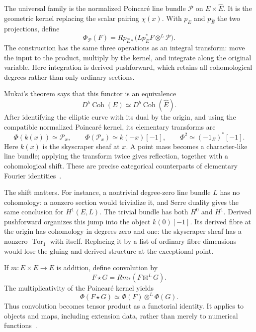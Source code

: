 \documentclass[11pt]{article}
\theoremstyle{remark}
\begin{document}
The universal family is the normalized Poincar\'e line bundle \(\mathcal P\) on \(E\times\widehat E\). It is the geometric kernel replacing the scalar pairing \(\chi(x)\). With \(p_E\) and \(p_{\widehat E}\) the two projections, define
\begin{equation}
\Phi_{\mathcal P}(F)
=Rp_{\widehat E*}
\bigl(Lp_E^*F\otimes^{L}\mathcal P\bigr).
\label{categorical:fm}
\end{equation}
The construction has the same three operations as an integral transform: move the input to the product, multiply by the kernel, and integrate along the original variable. Here integration is derived pushforward, which retains all cohomological degrees rather than only ordinary sections.

Mukai's theorem says that this functor is an equivalence
\[
D^b\operatorname{Coh}(E)
\simeq D^b\operatorname{Coh}(\widehat E).
\]
After identifying the elliptic curve with its dual by the origin, and using the compatible normalized Poincar\'e kernel, its elementary transforms are
\begin{equation}
\Phi(k(x))\simeq\mathcal P_x,
\qquad
\Phi(\mathcal P_x)\simeq k(-x)[-1],
\qquad
\Phi^2\simeq(-1_E)^*[-1].
\label{categorical:inversion}
\end{equation}
Here \(k(x)\) is the skyscraper sheaf at \(x\). A point mass becomes a character-like line bundle; applying the transform twice gives reflection, together with a cohomological shift. These are precise categorical counterparts of elementary Fourier identities~\cite{chen}.

The shift matters. For instance, a nontrivial degree-zero line bundle \(L\) has no cohomology: a nonzero section would trivialize it, and Serre duality gives the same conclusion for \(H^1(E,L)\). The trivial bundle has both \(H^0\) and \(H^1\). Derived pushforward organizes this jump into the object \(k(0)[-1]\). Its derived fibre at the origin has cohomology in degrees zero and one: the skyscraper sheaf has a nonzero \(\operatorname{Tor}_1\) with itself. Replacing it by a list of ordinary fibre dimensions would lose the gluing and derived structure at the exceptional point.

If \(m:E\times E\to E\) is addition, define convolution by
\[
F\star G=Rm_*(F\boxtimes^{L}G).
\]
The multiplicativity of the Poincar\'e kernel yields
\begin{equation}
\Phi(F\star G)\simeq
\Phi(F)\otimes^{L}\Phi(G).
\label{categorical:convolution}
\end{equation}
Thus convolution becomes tensor product as a functorial identity. It applies to objects and maps, including extension data, rather than merely to numerical functions~\cite{chen}.
\end{document}
